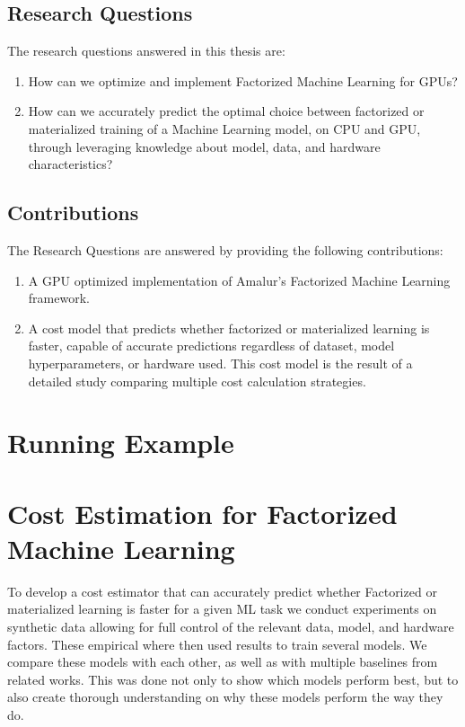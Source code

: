 \subsection{Research Questions}
The research questions answered in this thesis are:
\begin{enumerate}[leftmargin=1.5cm, label=\emph{RQ.\arabic*}]
    \item How can we optimize and implement Factorized Machine Learning for GPUs?
    \item How can we accurately predict the optimal choice between factorized or materialized training of a Machine Learning model, on CPU and GPU, through leveraging knowledge about model, data, and hardware characteristics?
\end{enumerate}

\subsection{Contributions}
The Research Questions are answered by providing the following contributions:
\begin{enumerate}[leftmargin=1.5cm, label=\emph{C.\arabic*}]
    \item A GPU optimized implementation of Amalur's Factorized Machine Learning framework.
    \item A cost model that predicts whether factorized or materialized learning is faster, capable of accurate predictions regardless of dataset, model hyperparameters, or hardware used. This cost model is the result of a detailed study comparing multiple cost calculation strategies.
\end{enumerate}

\section{Running Example}

\section{Cost Estimation for Factorized Machine Learning}
To develop a cost estimator that can accurately predict whether Factorized or materialized learning is faster for a given ML task we conduct experiments on synthetic data allowing for full control of the relevant data, model, and hardware factors. These empirical where then used results to train several models. We compare these models with each other, as well as with multiple baselines from related works. This was done not only to show which models perform best, but to also create thorough understanding on why these models perform the way they do.

